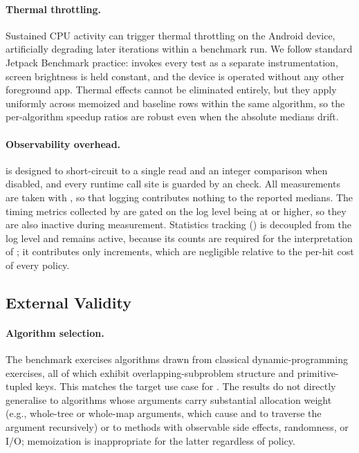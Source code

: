 \paragraph{Thermal throttling.}
Sustained CPU activity can trigger thermal throttling on the Android device, artificially degrading later iterations within a benchmark run. We follow standard Jetpack Benchmark practice:  invokes every test as a separate instrumentation, screen brightness is held constant, and the device is operated without any other foreground app. Thermal effects cannot be eliminated entirely, but they apply uniformly across memoized and baseline rows within the same algorithm, so the per-algorithm speedup ratios are robust even when the absolute medians drift.

\paragraph{Observability overhead.}
 is designed to short-circuit to a single  read and an integer comparison when disabled, and every runtime call site is guarded by an  check. All measurements are taken with , so that logging contributes nothing to the reported medians. The timing metrics collected by  are gated on the log level being at  or higher, so they are also inactive during measurement. Statistics tracking () is decoupled from the log level and remains active, because its counts are required for the interpretation of ; it contributes only  increments, which are negligible relative to the per-hit cost of every policy.

\subsection{External Validity}

\paragraph{Algorithm selection.}
The benchmark exercises \numAlgorithms algorithms drawn from classical dynamic-programming exercises, all of which exhibit overlapping-subproblem structure and primitive-tupled keys. This matches the target use case for . The results do not directly generalise to algorithms whose arguments carry substantial allocation weight (e.g., whole-tree or whole-map arguments, which cause  and  to traverse the argument recursively) or to methods with observable side effects, randomness, or I/O; memoization is inappropriate for the latter regardless of policy.

